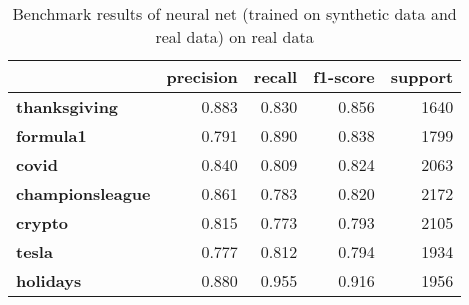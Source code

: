\begin{table}
\centering
\caption{Benchmark results of neural net (trained on synthetic data and real data) on real data}
\begin{tabular}{lrrrr}
\toprule
{} &  precision &  recall &  f1-score &  support \\
\midrule
\textbf{thanksgiving   } &      0.883 &   0.830 &     0.856 &     1640 \\
\textbf{formula1       } &      0.791 &   0.890 &     0.838 &     1799 \\
\textbf{covid          } &      0.840 &   0.809 &     0.824 &     2063 \\
\textbf{championsleague} &      0.861 &   0.783 &     0.820 &     2172 \\
\textbf{crypto         } &      0.815 &   0.773 &     0.793 &     2105 \\
\textbf{tesla          } &      0.777 &   0.812 &     0.794 &     1934 \\
\textbf{holidays       } &      0.880 &   0.955 &     0.916 &     1956 \\
\bottomrule
\end{tabular}
\end{table}
